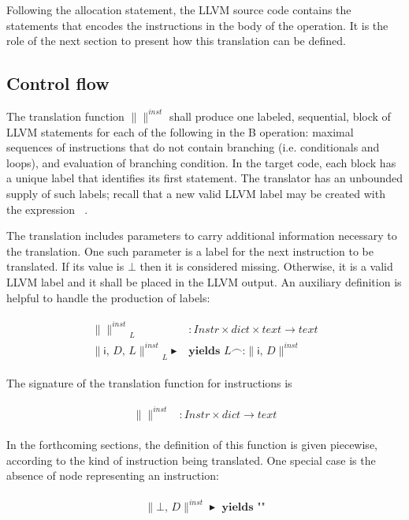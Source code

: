 \documentclass{article}
\newcommand{\trad}[2]{\ensuremath{\lVert \textsf{#1} \rVert^{\textit{#2}}}}
\DeclareMathOperator{\conc}{\smallfrown}
\DeclareMathOperator{\isdef}{\blacktriangleright}
\DeclareMathOperator{\name}{\mathcal{L}()}
\begin{document}
Following the allocation statement, the LLVM source code contains the
statements that encodes the instructions in the body of the
operation. It is the role of the next section to present how this
translation can be defined.

\subsection{Control flow}
\label{sec:trad-instr}

The translation function $\trad{}{inst}$ shall produce one labeled,
sequential, block of LLVM statements for each of the following in the
B operation: maximal sequences of instructions that do not contain
branching (i.e. conditionals and loops), and evaluation of branching
condition. In the target code, each block has a unique label that
identifies its first statement. The translator has an unbounded supply
of such labels; recall that a new valid LLVM label may be created with
the expression $\name$.

The translation includes parameters to carry additional information
necessary to the translation. One such parameter is a label for the
next instruction to be translated. If its value is $\bot$ then it is
considered missing. Otherwise, it is a valid LLVM label and it shall
be placed in the LLVM output. An auxiliary definition is helpful to
handle the production of labels:
\begin{framed}
\begin{align}
\begin{split}
  \trad{}{inst}_{L} &: Instr \times dict \times text \rightarrow text \\
  \trad{i, $D$, $L$}{inst}_L \isdef 
  & \textbf{yields } L \conc \texttt{:} \trad{i, $D$}{inst}  
\end{split}
\end{align}
\end{framed}

The signature of the translation function for instructions is
\begin{framed}
  \begin{align}
\begin{split}
    \trad{}{inst} &: Instr \times dict \rightarrow text
  \end{split}
\end{align}
\end{framed}
In the forthcoming sections, the definition of this function is given
piecewise, according to the kind of instruction being translated. One
special case is the absence of node representing an instruction:
\begin{framed}
  \begin{align}
\begin{split}
    \trad{$\bot$, $D$}{inst} \isdef \textbf{ yields } \texttt{""}
  \end{split}
\end{align}
\end{framed}
 
\end{document}
